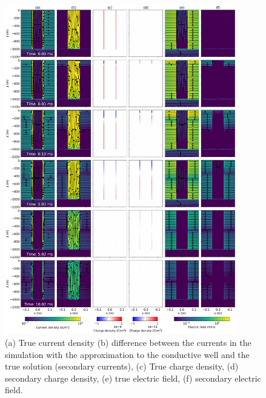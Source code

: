 \begin{figure}
    \begin{center}
    \includegraphics[width=0.9\textwidth]{figures/em_casing/electric-casing.png}
    \end{center}
\caption{
    (a) True current density (b) difference between the currents in the simulation with the approximation to the conductive well and the true solution (secondary currents), (c) True charge density, (d) secondary charge density, (e) true electric field, (f) secondary electric field.
}
\label{fig:electric-casing}
\end{figure}



